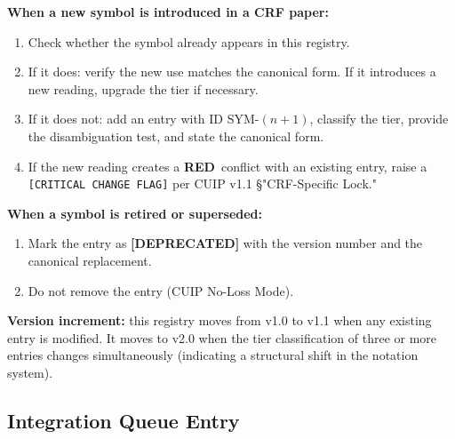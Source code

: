 \documentclass[12pt, a4paper]{article}
\newcommand{\TRED}{\textcolor{redframe}{\textbf{RED}}}
\begin{document}
\begin{rulebox}[title={How to Update This Registry}]
\textbf{When a new symbol is introduced in a CRF paper:}
\begin{enumerate}[leftmargin=*, noitemsep]
  \item Check whether the symbol already appears in this registry.
  \item If it does: verify the new use matches the canonical form.
    If it introduces a new reading, upgrade the tier if necessary.
  \item If it does not: add an entry with ID SYM-$(n+1)$, classify
    the tier, provide the disambiguation test, and state the
    canonical form.
  \item If the new reading creates a \TRED\ conflict with an
    existing entry, raise a \texttt{[CRITICAL CHANGE FLAG]} per
    CUIP v1.1 §"CRF-Specific Lock."
\end{enumerate}

\textbf{When a symbol is retired or superseded:}
\begin{enumerate}[leftmargin=*, noitemsep]
  \item Mark the entry as \textbf{[DEPRECATED]} with the version
    number and the canonical replacement.
  \item Do not remove the entry (CUIP No-Loss Mode).
\end{enumerate}

\textbf{Version increment:} this registry moves from v1.0 to v1.1
when any existing entry is modified. It moves to v2.0 when the
tier classification of three or more entries changes simultaneously
(indicating a structural shift in the notation system).
\end{rulebox}

\subsection{Integration Queue Entry}
\end{document}

